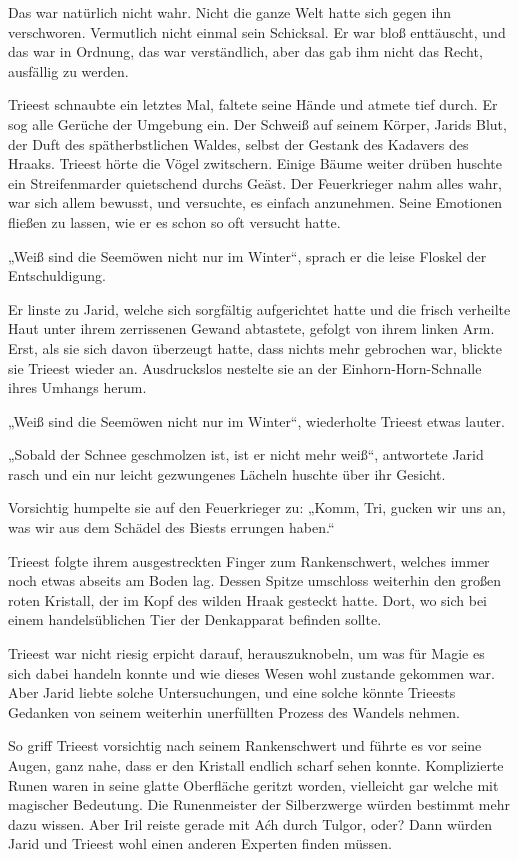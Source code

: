 Das war natürlich nicht wahr. Nicht die ganze Welt hatte sich gegen ihn verschworen. Vermutlich nicht einmal sein Schicksal. Er war bloß enttäuscht, und das war in Ordnung, das war verständlich, aber das gab ihm nicht das Recht, ausfällig zu werden.

Trieest schnaubte ein letztes Mal, faltete seine Hände und atmete tief durch. Er sog alle Gerüche der Umgebung ein. Der Schweiß auf seinem Körper, Jarids Blut, der Duft des spätherbstlichen Waldes, selbst der Gestank des Kadavers des Hraaks. Trieest hörte die Vögel zwitschern. Einige Bäume weiter drüben huschte ein Streifenmarder quietschend durchs Geäst. Der Feuerkrieger nahm alles wahr, war sich allem bewusst, und versuchte, es einfach anzunehmen. Seine Emotionen fließen zu lassen, wie er es schon so oft versucht hatte.

„Weiß sind die Seemöwen nicht nur im Winter“, sprach er die leise Floskel der Entschuldigung.

Er linste zu Jarid, welche sich sorgfältig aufgerichtet hatte und die frisch verheilte Haut unter ihrem zerrissenen Gewand abtastete, gefolgt von ihrem linken Arm. Erst, als sie sich davon überzeugt hatte, dass nichts mehr gebrochen war, blickte sie Trieest wieder an. Ausdruckslos nestelte sie an der Einhorn-Horn-Schnalle ihres Umhangs herum.

„Weiß sind die Seemöwen nicht nur im Winter“, wiederholte Trieest etwas lauter.

„Sobald der Schnee geschmolzen ist, ist er nicht mehr weiß“, antwortete Jarid rasch und ein nur leicht gezwungenes Lächeln huschte über ihr Gesicht.

Vorsichtig humpelte sie auf den Feuerkrieger zu: „Komm, Tri, gucken wir uns an, was wir aus dem Schädel des Biests errungen haben.“

Trieest folgte ihrem ausgestreckten Finger zum Rankenschwert, welches immer noch etwas abseits am Boden lag. Dessen Spitze umschloss weiterhin den großen roten Kristall, der im Kopf des wilden Hraak gesteckt hatte. Dort, wo sich bei einem handelsüblichen Tier der Denkapparat befinden sollte.

Trieest war nicht riesig erpicht darauf, herauszuknobeln, um was für Magie es sich dabei handeln konnte und wie dieses Wesen wohl zustande gekommen war. Aber Jarid liebte solche Untersuchungen, und eine solche könnte Trieests Gedanken von seinem weiterhin unerfüllten Prozess des Wandels nehmen.

So griff Trieest vorsichtig nach seinem Rankenschwert und führte es vor seine Augen, ganz nahe, dass er den Kristall endlich scharf sehen konnte. Komplizierte Runen waren in seine glatte Oberfläche geritzt worden, vielleicht gar welche mit magischer Bedeutung. Die Runenmeister der Silberzwerge würden bestimmt mehr dazu wissen. Aber Iril reiste gerade mit Aćh durch Tulgor, oder? Dann würden Jarid und Trieest wohl einen anderen Experten finden müssen.

